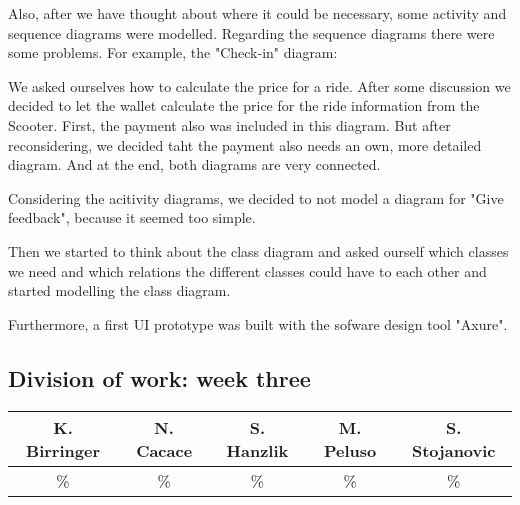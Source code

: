 \documentclass[a4paper, 12pt]{article}
\begin{document}
Also, after we have thought about where it could be necessary, some activity and sequence diagrams were modelled.
Regarding the sequence diagrams there were some problems.
For example, the "Check-in" diagram:

We asked ourselves how to calculate the price for a ride. After some discussion we decided to let the wallet calculate the price for the ride information from the Scooter.
First, the payment also was included in this diagram. But after reconsidering, we decided taht the payment also needs an own, more detailed diagram. And at the end, both diagrams are very connected.

Considering the acitivity diagrams, we decided to not model a diagram for "Give feedback", because it seemed too simple.

Then we started to think about the class diagram and asked ourself which classes we need and which relations the different classes could have to each other and started modelling the class diagram.

Furthermore, a first UI prototype was built with the sofware design tool "Axure". \cite{axure}

\newpage
\subsection{Division of work: week three}

\begin{table}[h]
\centering
\setlength{\tabcolsep}{12pt}
\begin{tabular}{|c|c|c|c|c|}
\hline
K. Birringer & N. Cacace & S. Hanzlik & M. Peluso & S. Stojanovic\\
\hline
\% & \% & \% & \% & \% \\ 
\hline
\end{tabular}
\end{table}

\end{document}

